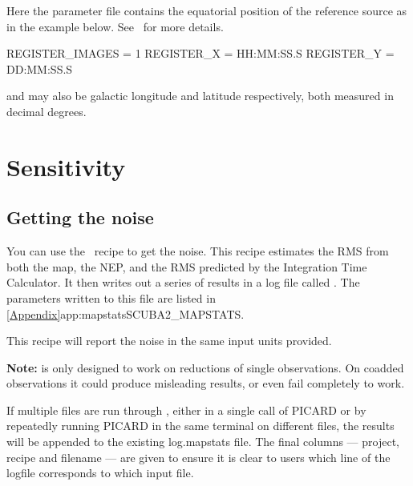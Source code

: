 \begin{terminalv}
\end{terminalv}

Here the parameter file contains the equatorial position of the
reference source as in the example below. See \picardsun\ for more
details.

\begin{terminalv}
REGISTER_IMAGES = 1
REGISTER_X  = HH:MM:SS.S
REGISTER_Y  = DD:MM:SS.S
\end{terminalv}

 and  may also be galactic
longitude and latitude respectively, both measured in decimal
degrees.

\section{Sensitivity}

\subsection{Getting the noise}
\label{sec:mapstats}

You can use the \picard\ recipe  to get the
noise. This recipe estimates the RMS from both the map, the NEP, and
the RMS predicted by the Integration Time Calculator. It then writes out
a series of results in a log file called . The
parameters written to this file are listed in
\cref{Appendix}{app:mapstats}{SCUBA2_MAPSTATS}.

\begin{terminalv}
\end{terminalv}
This recipe will report the noise in the same input units provided. 


\textbf{Note:}  is only designed to work on
reductions of single observations. On coadded observations it could
produce misleading results, or even fail completely to work.

If multiple files are run through , either in a single call
of PICARD or by repeatedly running PICARD in the same terminal on different
files, the results will be appended to the existing log.mapstats file.
The final columns — project, recipe and filename — are given to ensure it
is clear to users which line of the logfile corresponds to which input file.

